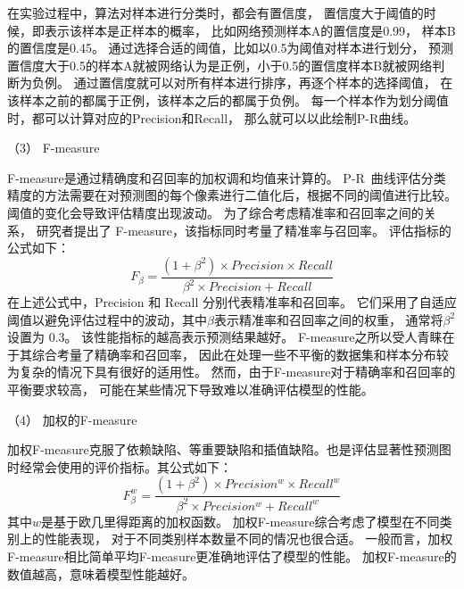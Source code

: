 在实验过程中，算法对样本进行分类时，都会有置信度，
置信度大于阈值的时候，即表示该样本是正样本的概率，
比如网络预测样本A的置信度是0.99，
样本B的置信度是0.45。
通过选择合适的阈值，比如以0.5为阈值对样本进行划分，
预测置信度大于0.5的样本A就被网络认为是正例，小于0.5的置信度样本B就被网络判断为负例。
通过置信度就可以对所有样本进行排序，再逐个样本的选择阈值，
在该样本之前的都属于正例，该样本之后的都属于负例。
每一个样本作为划分阈值时，都可以计算对应的Precision和Recall，
那么就可以以此绘制P-R曲线。






（3）
F-measure



F-measure是通过精确度和召回率的加权调和均值来计算的。
P-R~曲线评估分类精度的方法需要在对预测图的每个像素进行二值化后，根据不同的阈值进行比较。
阈值的变化会导致评估精度出现波动。
为了综合考虑精准率和召回率之间的关系，
研究者提出了 F-measure，该指标同时考量了精准率与召回率。
评估指标的公式如下：
%
%
\begin{equation}
	F_{\beta} = \frac{\left ( 1 + \beta^{2} \right ) \times Precision \times Recall }{\beta^{2} \times Precision + Recall } 
\end{equation}
%
%
在上述公式中，Precision 和 Recall 分别代表精准率和召回率。
它们采用了自适应阈值以避免评估过程中的波动，其中$\beta$表示精准率和召回率之间的权重，
通常将$\beta^{2}$设置为 0.3。
该性能指标的越高表示预测结果越好。
F-measure之所以受人青睐在于其综合考量了精确率和召回率，
因此在处理一些不平衡的数据集和样本分布较为复杂的情况下具有很好的适用性。
然而，由于F-measure对于精确率和召回率的平衡要求较高，
可能在某些情况下导致难以准确评估模型的性能。








（4）
加权的F-measure\par
%
%
加权F-measure克服了依赖缺陷、等重要缺陷和插值缺陷。也是评估显著性预测图时经常会使用的评价指标。其公式如下：
\begin{equation}
	F_{\beta}^{w} = \frac{\left ( 1 + \beta^{2} \right ) \times Precision^{w}  \times Recall^{w} }{\beta^{2} \times Precision^{w} + Recall^{w} } 
\end{equation}
%
%
其中$w$是基于欧几里得距离的加权函数。
加权F-measure综合考虑了模型在不同类别上的性能表现，
对于不同类别样本数量不同的情况也很合适。
一般而言，加权F-measure相比简单平均F-measure更准确地评估了模型的性能。
加权F-measure的数值越高，意味着模型性能越好。




